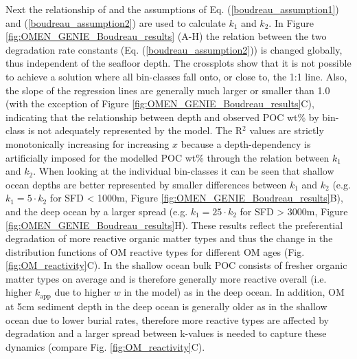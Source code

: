 \documentclass[gmd, manuscript]{copernicus}
\begin{document}
Next the relationship of \citet{boudreau1997diagenetic} and the assumptions of Eq. (\ref{boudreau_assumption1}) and (\ref{boudreau_assumption2}) are used to calculate $k_1$ 
and $k_2$. In Figure \ref{fig:OMEN_GENIE_Boudreau_results} (A-H) the relation between the two degradation rate constants (Eq. (\ref{boudreau_assumption2})) is changed globally, thus independent of the seafloor depth. 
The crossplots show that it is not possible to achieve a solution where all bin-classes fall onto, or close to, the 1:1 line. Also, the slope of the regression lines are generally much larger or smaller than 1.0 
(with the exception of Figure \ref{fig:OMEN_GENIE_Boudreau_results}C), indicating that the relationship between depth and observed POC wt\% by bin-class is not adequately represented by the model. 
The R$^2$ values are strictly monotonically increasing for increasing $x$ because a depth-dependency is artificially imposed for the modelled POC wt\% through the relation between $k_1$ and $k_2$. 
When looking at the individual bin-classes it can be seen that shallow ocean depths are better represented by smaller differences between $k_1$ and $k_2$ (e.g. $k_1 = 5 \cdot k_2$ for SFD < 1000m, Figure \ref{fig:OMEN_GENIE_Boudreau_results}B),
and the deep ocean by a larger spread (e.g. $k_1 = 25 \cdot k_2$ for SFD > 3000m, Figure \ref{fig:OMEN_GENIE_Boudreau_results}H). 
These results reflect the preferential degradation of more reactive organic matter types \citep{wakeham_compositions_1997, lee_composition_2000} and thus the change in the distribution functions of OM reactive types for different OM ages (Fig. \ref{fig:OM_reactivity}C). 
In the shallow ocean bulk POC consists of fresher organic matter types on average and is therefore generally more reactive overall (i.e. higher $k_\mathrm{app}$ due to higher $w$ in the model) as in the deep ocean. In addition, OM at 5cm sediment depth in 
the deep ocean is generally older as in the shallow ocean due to lower burial rates, therefore more reactive types are affected by degradation and a larger spread between k-values is needed to capture these dynamics (compare Fig. \ref{fig:OM_reactivity}C). 
\end{document}
